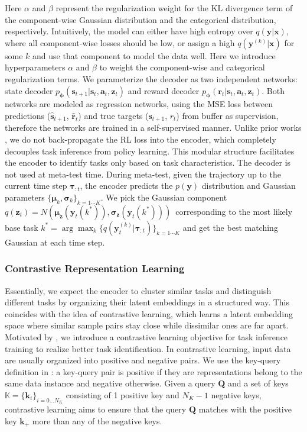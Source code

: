 \documentclass[letterpaper]{article} %
\begin{document}
Here $\alpha$ and $\beta$ represent the regularization weight for the KL divergence term of the component-wise Gaussian distribution and the categorical distribution, respectively. Intuitively, the model can either have high entropy over $q(\bm y|\bm x)$, where all component-wise losses should be low, or assign a high $q(\bm y^{(k)}|\bm x)$ for some $k$ and use that component to model the data well. Here we introduce hyperparameters $\alpha$ and $\beta$ to weight the component-wise and categorical regularization terms. We parameterize the decoder as two independent networks: state decoder $p_{\bm \phi}(\bm s_{t+1}|\bm s_{t}, \bm a_{t}, \bm z_{t})$ and reward decoder $p_{\bm \phi}(\bm r_{t}|\bm s_{t}, \bm a_{t}, \bm z_{t})$. Both networks are modeled as regression networks, using the MSE loss between predictions ($\hat{\bm s}_{t+1}$, $\hat{\bm r}_{t}$) and true targets ($\bm s_{t+1}$, $r_{t}$) from buffer as supervision, therefore the networks are trained in a self-supervised manner. Unlike prior works \cite{RL2, PEARL}, we do not back-propagate the RL loss into the encoder, which completely decouples task inference from policy learning. This modular structure facilitates the encoder to identify tasks only based on task characteristics. The decoder is not used at meta-test time. During meta-test, given the trajectory up to the current time step $\bm \tau_{:t}$, the encoder predicts the $p(\bm y)$ distribution and Gaussian parameters $\{\bm \mu_{k}, \bm \sigma_{k}\}_{k=1\cdots K}$. We pick the Gaussian component $q(\bm z_{t}) = N(\bm \mu_{\bm z}(\bm y_{t}(k^{*})), \bm \sigma_{\bm z}(\bm y_{t}(k^{*})))$\ corresponding to the most likely base task $k^{*}=\arg \max_{k} \{q(\bm y_{t}^{(k)} |\bm \tau_{:t})\}_{k=1\cdots K}$ and get the best matching Gaussian at each time step.



\subsubsection{Contrastive Representation Learning}
\label{sec:contrastive-learning}

Essentially, we expect the encoder to cluster similar tasks and distinguish different tasks by organizing their latent embeddings in a structured way. This coincides with the idea of contrastive learning, which learns a latent embedding space where similar sample pairs stay close while dissimilar ones are far apart. Motivated by \cite{MCAT, Contrastive-2}, we introduce a contrastive learning objective for task inference training to realize better task identification. In contrastive learning, input data are usually organized into positive and negative pairs. We use the key-query definition in \cite{InstanceDiscrimination,CURL-contrastive,TCL}: a key-query pair is positive if they are representations belong to the same data instance and negative otherwise. Given a query $\bm Q$ and a set of keys $ \mathbb{K} = \{\bm k_{i}\}_{i=0…N_{K}}$ consisting of 1 positive key and $N_{K}-1$ negative keys, contrastive learning aims to ensure that the query $\bm Q$ matches with the positive key $\bm k_{+}$ more than any of the negative keys.
\end{document}

